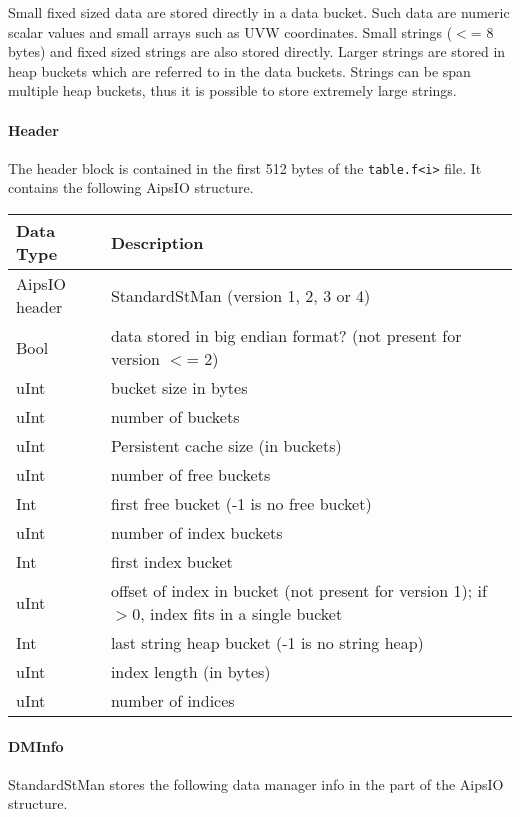 Small fixed sized data are stored directly in a data bucket. Such data
are numeric scalar values and small arrays such as UVW coordinates.
Small strings ($<$= 8 bytes) and fixed sized strings are also stored
directly. Larger strings are
stored in heap buckets which are referred to in the data
buckets. Strings can be span multiple heap buckets, thus it is possible
to store extremely large strings.

\paragraph{Header\\}
The header block is contained in the first 512 bytes of the
\texttt{table.f<i>} file. It contains the following AipsIO structure.

\vspace{0.15in}
\begin{tabular}{|l|p{13cm}|} \hline
  Data Type & Description \\ \hline\hline
  AipsIO header & StandardStMan (version 1, 2, 3 or 4) \\
  Bool & data stored in big endian format? (not present for version $<$= 2) \\
  uInt & bucket size in bytes \\
  uInt & number of buckets \\
  uInt & Persistent cache size (in buckets) \\
  uInt & number of free buckets \\
  Int & first free bucket (-1 is no free bucket) \\
  uInt & number of index buckets \\
  Int & first index bucket \\
  uInt & offset of index in bucket (not present for version 1); if $>$0,
  index fits in a single bucket \\
  Int & last string heap bucket (-1 is no string heap) \\
  uInt & index length (in bytes) \\
  uInt & number of indices \\
  \hline
\end{tabular}
\vspace{0.15in}

\paragraph{DMInfo\\}
StandardStMan stores the following data manager info in the
 part of the 
 AipsIO structure.

